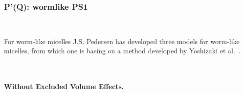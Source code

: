 \clearpage
\subsubsection{P'(Q): wormlike PS1} ~\\
\label{plugin:Pprime4wormPS1}

For worm-like micelles J.S. Pedersen \cite{Pedersen96Macrom} has developed three models
for worm-like micelles, from which one is basing on a method developed by Yoshizaki et al.\ \cite{Yoshizaki1980}.

~\\
\paragraph*{\textbf{Without Excluded Volume Effects.}}~\\

